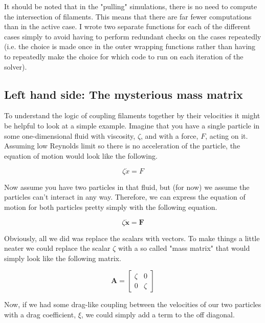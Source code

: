 It should be noted that in the "pulling" simulations, there is no need to compute the intersection of filaments.  This means that there are far fewer computations than in the active case.   I wrote two separate functions for each of the different cases simply to avoid having to perform redundant checks on the cases repeatedly (i.e. the choice is made once in the outer wrapping functions rather than having to repeatedly make the choice for which code to run on each iteration of the solver).

\subsection{Left hand side: The mysterious mass matrix}

To understand the logic of coupling filaments together by their velocities it might be helpful to look at a simple example.  Imagine that you have a single particle in some one-dimensional fluid with viscosity, $\zeta$, and with a force, $F$, acting on it.  Assuming low Reynolds limit so there is no acceleration of the particle, the equation of motion would look like the following.

\begin{equation}
\zeta\dot{x}=F
\end{equation}

Now assume you have two particles in that fluid, but (for now) we assume the particles can't interact in any way.  Therefore, we can express the equation of motion for both particles pretty simply with the following equation.

\begin{equation}
\zeta\mathbf{\dot{x}}=\mathbf{F}
\end{equation}

Obviously, all we did was replace the scalars with vectors.  To make things a little neater we could replace the scalar $\zeta$ with a so called "mass matrix" that would simply look like the following matrix.

\begin{equation}
\mathbf{A} = \begin{bmatrix} \zeta & 0 \\ 0 & \zeta \end{bmatrix}
\end{equation}

Now, if we had some drag-like coupling between the velocities of our two particles with a drag coefficient, $\xi$, we could simply add a term to the off diagonal.

